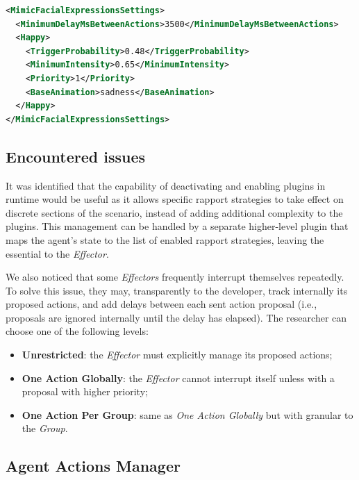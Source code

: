 \begin{lstlisting}[caption={Excerpt of the configuration file used by Mimic Facial Expressions \textit{Effector}.}, label={lst:MimicFacialExpressionsSettings},language=XML]
<MimicFacialExpressionsSettings>
  <MinimumDelayMsBetweenActions>3500</MinimumDelayMsBetweenActions>
  <Happy>
    <TriggerProbability>0.48</TriggerProbability>
    <MinimumIntensity>0.65</MinimumIntensity>
    <Priority>1</Priority>
    <BaseAnimation>sadness</BaseAnimation>
  </Happy>
</MimicFacialExpressionsSettings>
\end{lstlisting}

\subsection{Encountered issues}
\label{sub:sec:effectorPlugin}

It was identified that the capability of deactivating and enabling plugins in runtime would be useful as it allows specific rapport strategies to take effect on discrete sections of the scenario, instead of adding additional complexity to the plugins. This management can be handled by a separate higher-level plugin that maps the agent's state to the list of enabled rapport strategies, leaving the essential to the \textit{Effector}.

We also noticed that some \textit{Effectors} frequently interrupt themselves repeatedly. To solve this issue, they may, transparently to the developer, track internally its proposed actions, and add delays between each sent action proposal (i.e., proposals are ignored internally until the delay has elapsed). The researcher can choose one of the following levels:

\begin{itemize}
	\item \textbf{Unrestricted}: the \textit{Effector} must explicitly manage its proposed actions;
	\item \textbf{One Action Globally}: the \textit{Effector} cannot interrupt itself unless with a proposal with higher priority;
	\item \textbf{One Action Per Group}: same as \textit{One Action Globally} but with granular to the \textit{Group}.
\end{itemize}

\subsection{Agent Actions Manager}
\label{sub:sec:agentActionsManager}

